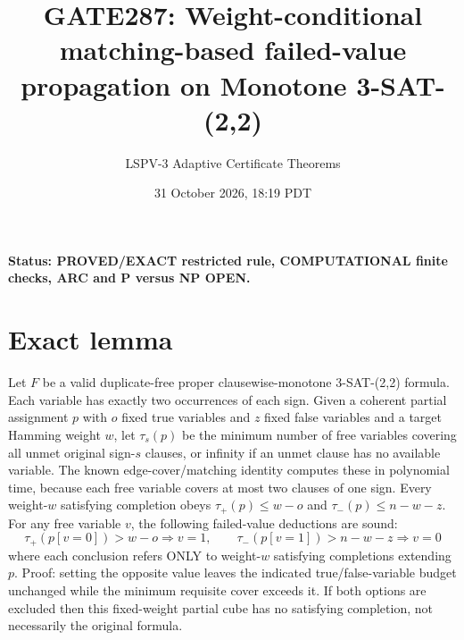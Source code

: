 \documentclass[11pt]{article}
\title{GATE287: Weight-conditional matching-based failed-value propagation on Monotone 3-SAT-(2,2)}
\author{LSPV-3 Adaptive Certificate Theorems}
\date{31 October 2026, 18:19 PDT}
\begin{document}
\maketitle
\noindent\textbf{Status: PROVED/EXACT restricted rule, COMPUTATIONAL finite checks, ARC and P versus NP OPEN.}
\section{Exact lemma}
Let $F$ be a valid duplicate-free proper clausewise-monotone 3-SAT-(2,2) formula. Each variable has exactly two occurrences of each sign. Given a coherent partial assignment $p$ with $o$ fixed true variables and $z$ fixed false variables and a target Hamming weight $w$, let $\tau_s(p)$ be the minimum number of free variables covering all unmet original sign-$s$ clauses, or infinity if an unmet clause has no available variable. The known edge-cover/matching identity computes these in polynomial time, because each free variable covers at most two clauses of one sign.
Every weight-$w$ satisfying completion obeys $\tau_+(p)\le w-o$ and $\tau_-(p)\le n-w-z$. For any free variable $v$, the following failed-value deductions are sound:
\[\tau_+(p[v=0])>w-o\Longrightarrow v=1,\qquad \tau_-(p[v=1])>n-w-z\Longrightarrow v=0\]
where each conclusion refers ONLY to weight-$w$ satisfying completions extending $p$. Proof: setting the opposite value leaves the indicated true/false-variable budget unchanged while the minimum requisite cover exceeds it. If both options are excluded then this fixed-weight partial cube has no satisfying completion, not necessarily the original formula.
\end{document}
